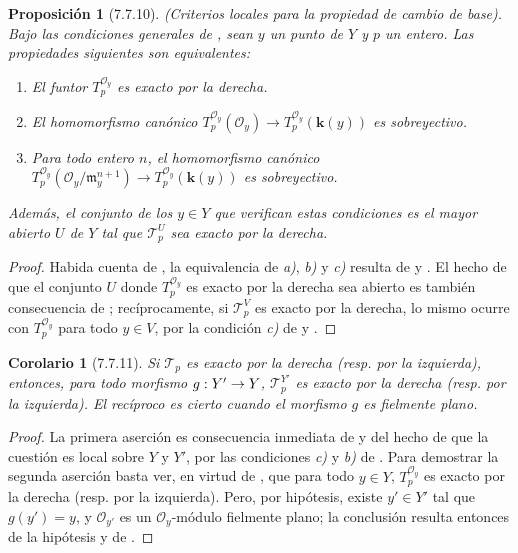 \documentclass[10pt,oneside,openany]{book}
\theoremstyle{egaenv}\newtheorem*{env}{---}
\theoremstyle{egastatement}
\newtheorem*{proposition}{Proposición}
\newtheorem*{corollary}{Corolario}
\theoremstyle{egadescription}
\newcommand{\oldpage}[2][]{\marginnote{\normalfont\scriptsize\textbf{#1}\,|\,#2}\ignorespaces}
\renewcommand{\to}{\mathchoice{\longrightarrow}{\rightarrow}{\rightarrow}{\rightarrow}}
\begin{document}
\begin{proposition}[7.7.10]
\label{III.7.7.10}
\textnormal{(Criterios locales para la propiedad de cambio de base).} Bajo las
condiciones generales de \textup{}, sean $y$ un punto de $Y$ y $p$ un
entero. Las propiedades siguientes son equivalentes:
\begin{enumerate}
  \item[\textup{a)}] El funtor $T_p^{\mathscr O_y}$ es exacto por la derecha.

  \item[\textup{b)}] El homomorfismo canónico
    $      T_p^{\mathscr O_y}(\mathscr O_y)
      \longrightarrow
      T_p^{\mathscr O_y}(\boldsymbol{k}(y))$
    es sobreyectivo.

  \item[\textup{c)}] Para todo entero $n$, el homomorfismo canónico
    $      T_p^{\mathscr O_y}
      (\mathscr O_y/\mathfrak m_y^{n+1})
      \longrightarrow
      T_p^{\mathscr O_y}(\boldsymbol{k}(y))$
    es sobreyectivo.
\end{enumerate}
Además, el conjunto de los $y\in Y$ que verifican estas condiciones es el
mayor abierto $U$ de $Y$ tal que $\mathscr T_p^U$ sea exacto por la derecha.
\end{proposition}

\begin{proof}
Habida cuenta de , la equivalencia de \emph{a)}, \emph{b)} y \emph{c)} resulta de
 y . El hecho de que el conjunto $U$ donde
$T_p^{\mathscr O_y}$ es exacto por la derecha sea abierto es también
consecuencia de ; recíprocamente, si $\mathscr T_p^V$ es exacto
por la derecha, lo mismo ocurre con $T_p^{\mathscr O_y}$ para todo $y\in V$,
por la condición \emph{c)} de  y .
\end{proof}

\begin{corollary}[7.7.11]
\label{III.7.7.11}
Si $\mathscr T_p$ es exacto por la derecha \textup{(resp.} por la izquierda\textup{)},
entonces, para todo morfismo $g:Y'\to Y$, $\mathscr T_p^{Y'}$ es exacto por la
derecha \textup{(resp.} por la izquierda\textup{)}. El recíproco es cierto cuando el
morfismo $g$ es fielmente plano.
\end{corollary}

\oldpage[III]{204}
\begin{proof}
La primera aserción es consecuencia inmediata de  y del hecho
de que la cuestión es local sobre $Y$ y $Y'$, por las condiciones \emph{c)} y \emph{b)} de
. Para demostrar la segunda aserción basta ver, en virtud de
, que para todo $y\in Y$, $T_p^{\mathscr O_y}$ es exacto por
la derecha (resp. por la izquierda). Pero, por hipótesis, existe
$y'\in Y'$ tal que $g(y')=y$, y $\mathscr O_{y'}$ es un
$\mathscr O_y$-módulo fielmente plano; la conclusión resulta entonces de la
hipótesis y de .
\end{proof}
\end{document}
